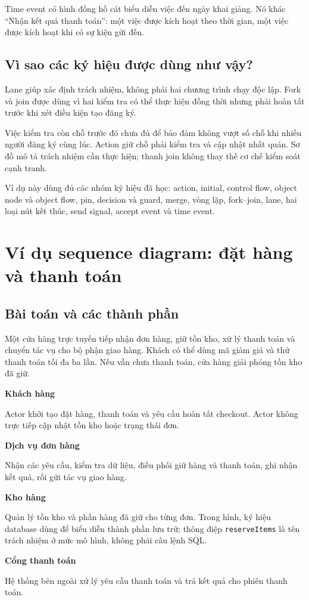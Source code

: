 \documentclass[12pt,a4paper]{article}
\newcommand{\code}[1]{\texttt{#1}}
\newcommand{\point}[1]{\par\medskip\noindent\textbf{#1}\par\nobreak\smallskip}
\newcommand{\chapter}[1]{\clearpage\section{#1}}
\begin{document}
Time event có hình đồng hồ cát biểu diễn việc đến ngày khai giảng. Nó khác “Nhận kết quả thanh toán”: một việc được kích hoạt theo thời gian, một việc được kích hoạt khi có sự kiện gửi đến.

\subsection{Vì sao các ký hiệu được dùng như vậy?}
Lane giúp xác định trách nhiệm, không phải hai chương trình chạy độc lập. Fork và join được dùng vì hai kiểm tra có thể thực hiện đồng thời nhưng phải hoàn tất trước khi xét điều kiện tạo đăng ký.

Việc kiểm tra còn chỗ trước đó chưa đủ để bảo đảm không vượt số chỗ khi nhiều người đăng ký cùng lúc. Action giữ chỗ phải kiểm tra và cập nhật nhất quán. Sơ đồ mô tả trách nhiệm cần thực hiện; thanh join không thay thế cơ chế kiểm soát cạnh tranh.

Ví dụ này dùng đủ các nhóm ký hiệu đã học: action, initial, control flow, object node và object flow, pin, decision và guard, merge, vòng lặp, fork--join, lane, hai loại nút kết thúc, send signal, accept event và time event.

\chapter{Ví dụ sequence diagram: đặt hàng và thanh toán}
\subsection{Bài toán và các thành phần}
Một cửa hàng trực tuyến tiếp nhận đơn hàng, giữ tồn kho, xử lý thanh toán và chuyển tác vụ cho bộ phận giao hàng. Khách có thể dùng mã giảm giá và thử thanh toán tối đa ba lần. Nếu vẫn chưa thanh toán, cửa hàng giải phóng tồn kho đã giữ.

\point{Khách hàng}
Actor khởi tạo đặt hàng, thanh toán và yêu cầu hoàn tất checkout. Actor không trực tiếp cập nhật tồn kho hoặc trạng thái đơn.

\point{Dịch vụ đơn hàng}
Nhận các yêu cầu, kiểm tra dữ liệu, điều phối giữ hàng và thanh toán, ghi nhận kết quả, rồi gửi tác vụ giao hàng.

\point{Kho hàng}
Quản lý tồn kho và phần hàng đã giữ cho từng đơn. Trong hình, ký hiệu database dùng để biểu diễn thành phần lưu trữ; thông điệp \code{reserveItems} là tên trách nhiệm ở mức mô hình, không phải câu lệnh SQL.

\point{Cổng thanh toán}
Hệ thống bên ngoài xử lý yêu cầu thanh toán và trả kết quả cho phiên thanh toán.
\end{document}

